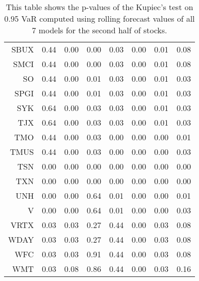 \begin{table}[ht]
\begin{tabular}{rrrrrrrr}
  SBUX & 0.44 & 0.00 & 0.00 & 0.03 & 0.00 & 0.01 & 0.08 \\ 
  SMCI & 0.44 & 0.00 & 0.00 & 0.03 & 0.00 & 0.01 & 0.08 \\ 
  SO & 0.44 & 0.00 & 0.01 & 0.03 & 0.00 & 0.01 & 0.03 \\ 
  SPGI & 0.44 & 0.00 & 0.01 & 0.03 & 0.00 & 0.01 & 0.03 \\ 
  SYK & 0.64 & 0.00 & 0.03 & 0.03 & 0.00 & 0.01 & 0.03 \\ 
  TJX & 0.64 & 0.00 & 0.03 & 0.03 & 0.00 & 0.01 & 0.03 \\ 
  TMO & 0.44 & 0.00 & 0.03 & 0.00 & 0.00 & 0.00 & 0.01 \\ 
  TMUS & 0.44 & 0.00 & 0.03 & 0.00 & 0.00 & 0.00 & 0.03 \\ 
  TSN & 0.00 & 0.00 & 0.00 & 0.00 & 0.00 & 0.00 & 0.00 \\ 
  TXN & 0.00 & 0.00 & 0.00 & 0.00 & 0.00 & 0.00 & 0.00 \\ 
  UNH & 0.00 & 0.00 & 0.64 & 0.01 & 0.00 & 0.00 & 0.01 \\ 
  V & 0.00 & 0.00 & 0.64 & 0.01 & 0.00 & 0.00 & 0.03 \\ 
  VRTX & 0.03 & 0.03 & 0.27 & 0.44 & 0.00 & 0.03 & 0.08 \\ 
  WDAY & 0.03 & 0.03 & 0.27 & 0.44 & 0.00 & 0.03 & 0.08 \\ 
  WFC & 0.03 & 0.03 & 0.91 & 0.44 & 0.00 & 0.03 & 0.08 \\ 
  WMT & 0.03 & 0.08 & 0.86 & 0.44 & 0.00 & 0.03 & 0.16 \\ 
   \hline
\end{tabular}
\caption[Kupiec's test p-values, alpha =0.95 (2)]{This table shows the p-values of the Kupiec's test on 0.95 VaR computed using rolling forecast values of all 7 models for the second half of stocks.} 
\label{Table:Kupiec_test_rolling_0.95_2}
\end{table}
